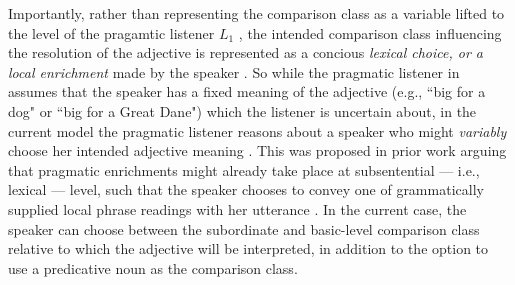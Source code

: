 Importantly, rather than representing the comparison class as a variable lifted to the level of the pragamtic listener $L_1$ \parencite[as proposed by][]{tessler2017warm}, the intended comparison class influencing the resolution of the adjective is represented as a concious \emph{lexical choice, or a local enrichment} made by the speaker \parencite[e.g., discussed by][]{chierchia2012grammatical, problang}. So while the pragmatic listener in \textcite{tessler2017warm} assumes that the speaker has a fixed meaning of the adjective (e.g., ``big for a dog" or ``big for a Great Dane") which the listener is uncertain about, in the current model the pragmatic listener reasons about a speaker who might \emph{variably} choose her intended adjective meaning \parencite[cf.][]{problang}. 
This was proposed in prior work arguing that pragmatic enrichments might already take place at subsentential --- i.e., lexical --- level, such that the speaker chooses to convey one of grammatically supplied local phrase readings with her utterance \parencite[for instance, applied to scalar implicatures by][]{chierchia2012grammatical}. In the current case, the speaker can choose between the subordinate and basic-level comparison class relative to which the adjective will be interpreted, in addition to the option to use a predicative noun as the comparison class. 

